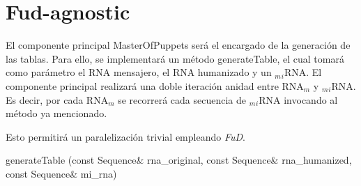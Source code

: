\section{Fud-agnostic}
\label{fud}

\par El componente principal \textsf{MasterOfPuppets} será el encargado de la generación de las tablas. Para ello, se implementará un método \textsf{generateTable}, el cual tomará como parámetro el RNA mensajero, el RNA humanizado y un $_m$$_i$RNA. El componente principal realizará una doble iteración anidad entre RNA$_m$ y $_m$$_i$RNA. Es decir, por cada RNA$_m$ se recorrerá cada secuencia de $_m$$_i$RNA invocando al método ya mencionado.

\par Esto permitirá un paralelización trivial empleando \emph{FuD}.

\begin{center}
\textsf{generateTable (const Sequence\& rna\_original, const Sequence\& rna\_humanized, const Sequence\& mi\_rna)}
\end{center}

